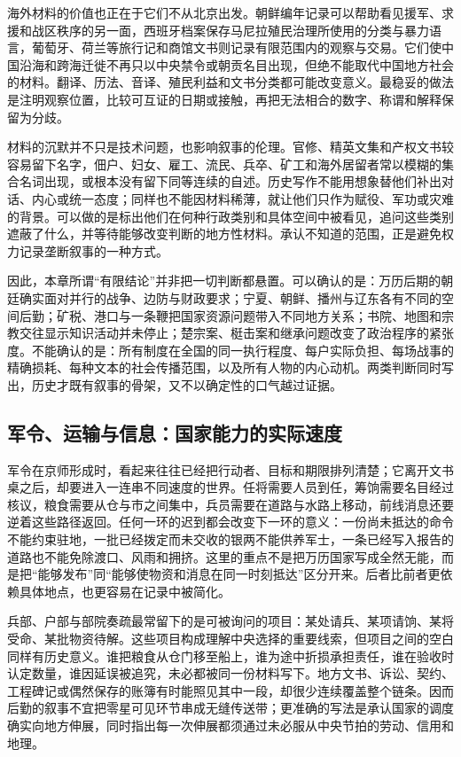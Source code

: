 海外材料的价值也正在于它们不从北京出发。朝鲜编年记录可以帮助看见援军、求援和战区秩序的另一面，西班牙档案保存马尼拉殖民治理所使用的分类与暴力语言，葡萄牙、荷兰等旅行记和商馆文书则记录有限范围内的观察与交易。它们使中国沿海和跨海迁徙不再只以中央禁令或朝贡名目出现，但绝不能取代中国地方社会的材料。翻译、历法、音译、殖民利益和文书分类都可能改变意义。最稳妥的做法是注明观察位置，比较可互证的日期或接触，再把无法相合的数字、称谓和解释保留为分歧。

材料的沉默并不只是技术问题，也影响叙事的伦理。官修、精英文集和产权文书较容易留下名字，佃户、妇女、雇工、流民、兵卒、矿工和海外居留者常以模糊的集合名词出现，或根本没有留下同等连续的自述。历史写作不能用想象替他们补出对话、内心或统一态度；同样也不能因材料稀薄，就让他们只作为赋役、军功或灾难的背景。可以做的是标出他们在何种行政类别和具体空间中被看见，追问这些类别遮蔽了什么，并等待能够改变判断的地方性材料。承认不知道的范围，正是避免权力记录垄断叙事的一种方式。

因此，本章所谓“有限结论”并非把一切判断都悬置。可以确认的是：万历后期的朝廷确实面对并行的战争、边防与财政要求；宁夏、朝鲜、播州与辽东各有不同的空间后勤；矿税、港口与一条鞭把国家资源问题带入不同地方关系；书院、地图和宗教交往显示知识活动并未停止；楚宗案、梃击案和继承问题改变了政治程序的紧张度。不能确认的是：所有制度在全国的同一执行程度、每户实际负担、每场战事的精确损耗、每种文本的社会传播范围，以及所有人物的内心动机。两类判断同时写出，历史才既有叙事的骨架，又不以确定性的口气越过证据。


\subsection{军令、运输与信息：国家能力的实际速度}

军令在京师形成时，看起来往往已经把行动者、目标和期限排列清楚；它离开文书桌之后，却要进入一连串不同速度的世界。任将需要人员到任，筹饷需要名目经过核议，粮食需要从仓与市之间集中，兵员需要在道路与水路上移动，前线消息还要逆着这些路径返回。任何一环的迟到都会改变下一环的意义：一份尚未抵达的命令不能约束驻地，一批已经拨定而未交收的银两不能供养军士，一条已经写入报告的道路也不能免除渡口、风雨和拥挤。这里的重点不是把万历国家写成全然无能，而是把“能够发布”同“能够使物资和消息在同一时刻抵达”区分开来。后者比前者更依赖具体地点，也更容易在记录中被简化。

兵部、户部与部院奏疏最常留下的是可被询问的项目：某处请兵、某项请饷、某将受命、某批物资待解。这些项目构成理解中央选择的重要线索，但项目之间的空白同样有历史意义。谁把粮食从仓门移至船上，谁为途中折损承担责任，谁在验收时认定数量，谁因延误被追究，未必都被同一份材料写下。地方文书、诉讼、契约、工程碑记或偶然保存的账簿有时能照见其中一段，却很少连续覆盖整个链条。因而后勤的叙事不宜把零星可见环节串成无缝传送带；更准确的写法是承认国家的调度确实向地方伸展，同时指出每一次伸展都须通过未必服从中央节拍的劳动、信用和地理。


